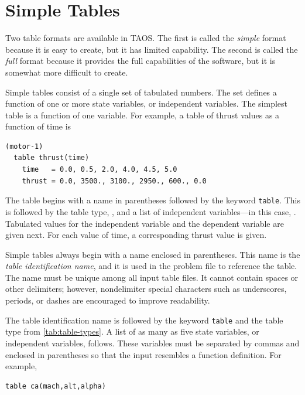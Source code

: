 \section{Simple Tables}\label{sec:simple-tables}

Two table formats are available in TAOS. The first is called the \emph{simple}
format because it is easy to create, but it has limited capability. The second is
called the \emph{full} format because it provides the full capabilities of the
software, but it is somewhat more difficult to create.

Simple tables consist of a single set of tabulated numbers. The set defines a function
of one or more state variables, or independent variables. The simplest table is a
function of one variable. For example, a table of thrust values as a function of time
is

\begin{lstlisting}[style=taosmanual]
(motor-1)
  table thrust(time)
    time   = 0.0, 0.5, 2.0, 4.0, 4.5, 5.0
    thrust = 0.0, 3500., 3100., 2950., 600., 0.0
\end{lstlisting}

The table begins with a name in parentheses followed by the keyword
\texttt{table}. This is followed by the table type, , and a list of
independent variables---in this case, . Tabulated values for the
independent variable and the dependent variable are given next. For each value of
time, a corresponding thrust value is given.


Simple tables always begin with a name enclosed in parentheses. This name is the
\emph{table identification name}, and it is used in the problem file to reference the
table. The name must be unique among all input table files. It cannot contain spaces
or other delimiters; however, nondelimiter special characters such as underscores,
periods, or dashes are encouraged to improve readability.


The table identification name is followed by the keyword \texttt{table} and the table
type from \cref{tab:table-types}. A list of as many as five state variables, or
independent variables, follows. These variables must be separated by commas and
enclosed in parentheses so that the input resembles a function definition. For
example,

\begin{lstlisting}[style=taosmanual]
table ca(mach,alt,alpha)
\end{lstlisting}

